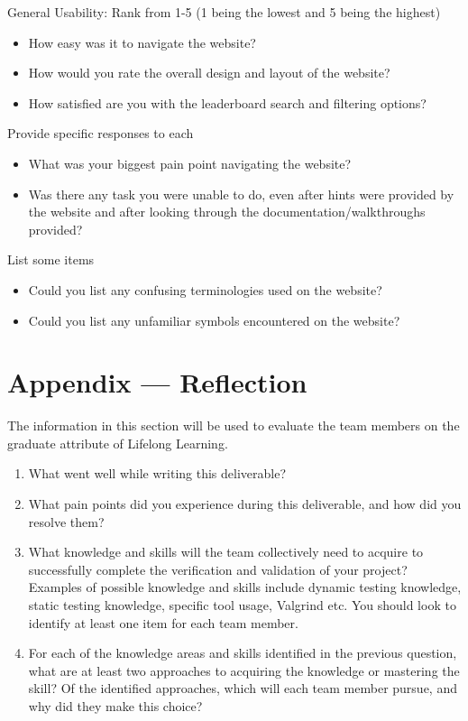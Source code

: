 \documentclass[12pt, titlepage]{article}
\begin{document}
General Usability: Rank from 1-5 (1 being the lowest and 5 being the highest)
\begin{itemize}
    \item How easy was it to navigate the website?
    \item How would you rate the overall design and layout of the website?
    \item How satisfied are you with the leaderboard search and filtering options?
\end{itemize}
Provide specific responses to each
\begin{itemize}
    \item What was your biggest pain point navigating 
    the website?
    \item Was there any task you were unable to do, even after hints were provided by the website and after looking through the documentation/walkthroughs provided?
\end{itemize}
List some items
\begin{itemize}
    \item Could you list any confusing terminologies used on the website?
    \item Could you list any unfamiliar symbols encountered on the website?
\end{itemize}


\newpage{}
\section*{Appendix --- Reflection}

The information in this section will be used to evaluate the team members on the
graduate attribute of Lifelong Learning.



\begin{enumerate}
  \item What went well while writing this deliverable? 
  \item What pain points did you experience during this deliverable, and how
    did you resolve them?
  \item What knowledge and skills will the team collectively need to acquire to
  successfully complete the verification and validation of your project?
  Examples of possible knowledge and skills include dynamic testing knowledge,
  static testing knowledge, specific tool usage, Valgrind etc.  You should look to
  identify at least one item for each team member.
  \item For each of the knowledge areas and skills identified in the previous
  question, what are at least two approaches to acquiring the knowledge or
  mastering the skill?  Of the identified approaches, which will each team
  member pursue, and why did they make this choice?
\end{enumerate}
\end{document}
